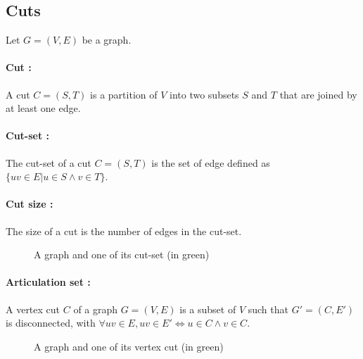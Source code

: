 \subsection{Cuts}
Let $G=(V,E)$ be a graph.
\paragraph{Cut :}
A cut $C=(S,T)$ is a partition of $V$ into two subsets $S$ and $T$ that are 
joined by at least one edge.

\paragraph{Cut-set :}
The cut-set of a cut $C=(S,T)$ is the set of edge defined as $\{uv \in E | u \in S \wedge v \in T\}$.

\paragraph{Cut size :}
The size of a cut is the number of edges in the cut-set.

\begin{figure}[!h]
  \begin{center}
    
  \end{center}
  \caption{A graph and one of its cut-set (in green)}
\end{figure}


\paragraph{Articulation set :}
A vertex cut $C$ of a graph $G=(V,E)$ is a subset of $V$ such that
$G' = (C,E')$ is disconnected, with
$\forall uv \in E, uv \in E' \Leftrightarrow u \in C \wedge v \in C$.

\begin{figure}[!h]
  \begin{center}
    
  \end{center}
  \caption{A graph and one of its vertex cut (in green)}
\end{figure}

